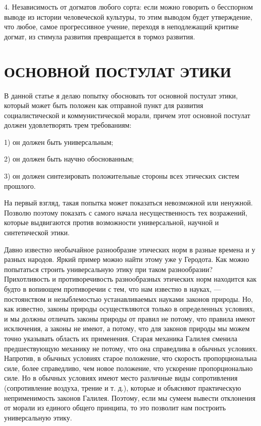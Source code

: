 4. Независимость от догматов любого сорта: если можно говорить о
бесспорном выводе из истории человеческой культуры, то этим выводом
будет утверждение, что любое, самое прогрессивное учение, переходя в
неподлежащий критике догмат, из стимула развития превращается в тормоз
развития.

\section{ОСНОВНОЙ ПОСТУЛАТ ЭТИКИ}

В данной статье я делаю попытку обосновать тот основной постулат
этики, который может быть положен как отправной пункт для развития
социалистической и коммунистической морали, причем этот основной
постулат должен удовлетворять трем требованиям:

1) он должен быть универсальным;

2) он должен быть научно обоснованным;

3) он должен синтезировать положительные стороны всех этических систем
прошлого.

На первый взгляд, такая попытка может показаться невозможной или
ненужной. Позволю поэтому показать с самого начала несущественность
тех возражений, которые выдвигаются против возможности универсальной,
научной и синтетической этики.

Давно известно необычайное разнообразие этических норм в разные
времена и у разных народов. Яркий пример можно найти этому уже у
Геродота. Как можно попытаться строить универсальную этику при таком
разнообразии? Прихотливость и противоречивость разнообразных этических
норм находится как будто в вопиющем противоречии с тем, что нам
известно в науках, --- постоянством и незыблемостью устанавливаемых
науками законов природы. Но, как известно, законы природы
осуществляются только в определенных условиях, и мы должны отличать
законы природы от правил не потому, что правила имеют исключения, а
законы не имеют, а потому, что для законов природы мы можем точно
указывать область их применения. Старая механика Галилея сменила
предшествующую механику не потому, что она справедлива в обычных
условиях. Напротив, в обычных условиях старое положение, что скорость
пропорциональна силе, более справедливо, чем новое положение, что
ускорение пропорционально силе. Но в обычных условиях имеют место
различные виды сопротивления (сопротивление воздуха, трение и т. д.),
которые и объясняют практическую неприменимость законов Галилея.
Поэтому, если мы сумеем вывести отклонения от морали из единого общего
принципа, то это позволит нам построить универсальную этику.

